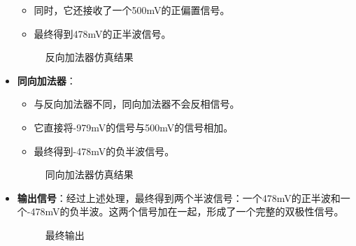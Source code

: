 \documentclass[UTF8,titlepage,a4paper]{ctexart}
\numberwithin{figure}{section}
\begin{document}
\begin{itemize}
\begin{itemize}
        \item 同时，它还接收了一个500mV的正偏置信号。
        \item 最终得到478mV的正半波信号。
    \end{itemize}
    \begin{figure}[H]
        \centering
         \caption{反向加法器仿真结果}
         \label{}
        \end{figure}

    \item \textbf{同向加法器}：
    \begin{itemize}
        \item 与反向加法器不同，同向加法器不会反相信号。
        \item 它直接将-979mV的信号与500mV的信号相加。
        \item 最终得到-478mV的负半波信号。
    \end{itemize}
    \begin{figure}[H]
        \centering
         \caption{同向加法器仿真结果}
         \label{}
        \end{figure}
    \item \textbf{输出信号}：经过上述处理，最终得到两个半波信号：一个478mV的正半波和一个-478mV的负半波。这两个信号加在一起，形成了一个完整的双极性信号。
    \begin{figure}[H]
        \centering
         \caption{最终输出}
         \label{}
        \end{figure}
\end{itemize}
\end{document}
